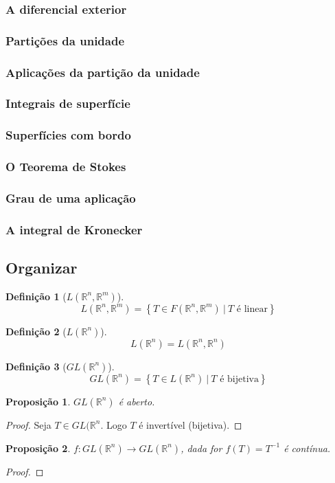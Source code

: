 \documentclass{article}
\newtheorem{prop}{Proposição}[section]
\theoremstyle{theorem}
\theoremstyle{lemma}
\theoremstyle{definition}
\newtheorem{definicao}{Definição}[section]
\theoremstyle{remark}
\begin{document}
   \subsubsection{A diferencial exterior}
   \subsubsection{Partições da unidade}
   \subsubsection{Aplicações da partição da unidade}
   \subsubsection{Integrais de superfície}
   \subsubsection{Superfícies com bordo}
   \subsubsection{O Teorema de Stokes}
   \subsubsection{Grau de uma aplicação}
   \subsubsection{ A integral de Kronecker}
\subsection{Organizar}
\begin{definicao}[$L(\mathbb{R}^n, \mathbb{R}^m)$]
	$$L(\mathbb{R}^n, \mathbb{R}^m) = \left\{ T \in F(\mathbb{R}^n, \mathbb{R}^m) \: | \: T \text{ é linear}\right\}$$
\end{definicao}
\begin{definicao}[$L(\mathbb{R}^n)$]
	$$L(\mathbb{R}^n) = L(\mathbb{R}^n, \mathbb{R}^n)$$
\end{definicao}
\begin{definicao}[$GL(\mathbb{R}^n)$]
	$$GL(\mathbb{R}^n) = \left\{ T \in L(\mathbb{R}^n) \: | \: T \text{ é bijetiva}\right\}$$
\end{definicao}
\begin{prop}
	$GL(\mathbb{R}^n)$ é aberto.
\end{prop}
\begin{proof}
	Seja $T\in GL(\mathbb{R}^n$. Logo $T$ é  invertível (bijetiva). 
\end{proof}
\begin{prop}
	$f:GL(\mathbb{R}^n) \to GL(\mathbb{R}^n)$, dada for $f(T) = T^{-1}$ é contínua.
\end{prop}
\begin{proof}
\end{proof}
\end{document}
